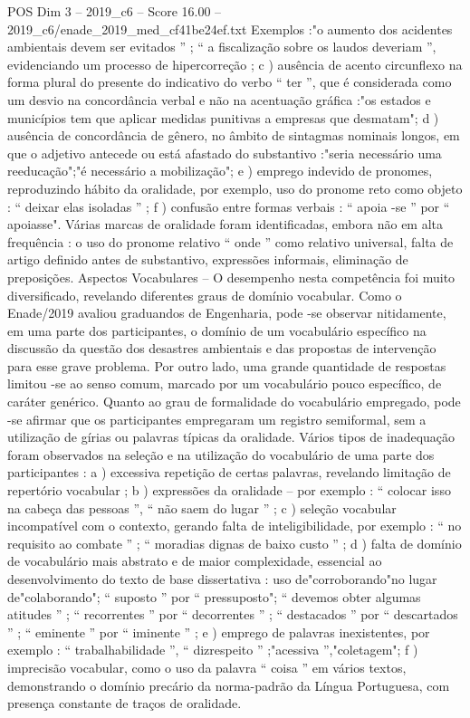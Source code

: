 \begin{textsample}{POS Dim 3 – 2019\_c6 – Score 16.00 – 2019\_c6/enade\_2019\_med\_cf41be24ef.txt}
Exemplos :"o aumento dos acidentes ambientais devem ser evitados ” ; “ a fiscalização sobre os laudos deveriam ”, evidenciando um processo de hipercorreção ; c ) ausência de acento circunflexo na forma plural do presente do indicativo do verbo “ ter ”, que é considerada como um desvio na concordância verbal e não na acentuação gráfica :"os estados e municípios tem que aplicar medidas punitivas a empresas que desmatam"; d ) ausência de concordância de gênero, no âmbito de sintagmas nominais longos, em que o adjetivo antecede ou está afastado do substantivo :"seria necessário uma reeducação";"é necessário a mobilização"; e ) emprego indevido de pronomes, reproduzindo hábito da oralidade, por exemplo, uso do pronome reto como objeto : “ deixar elas isoladas ” ; f ) confusão entre formas verbais : “ apoia -se ” por “ apoiasse".
Várias marcas de oralidade foram identificadas, embora não em alta frequência : o uso do pronome relativo “ onde ” como relativo universal, falta de artigo definido antes de substantivo, expressões informais, eliminação de preposições.
Aspectos Vocabulares – O desempenho nesta competência foi muito diversificado, revelando diferentes graus de domínio vocabular.
Como o Enade/2019 avaliou graduandos de Engenharia, pode -se observar nitidamente, em uma parte dos participantes, o domínio de um vocabulário específico na discussão da questão dos desastres ambientais e das propostas de intervenção para esse grave problema.
Por outro lado, uma grande quantidade de respostas limitou -se ao senso comum, marcado por um vocabulário pouco específico, de caráter genérico.
Quanto ao grau de formalidade do vocabulário empregado, pode -se afirmar que os participantes empregaram um registro semiformal, sem a utilização de gírias ou palavras típicas da oralidade.
Vários tipos de inadequação foram observados na seleção e na utilização do vocabulário de uma parte dos participantes : a ) excessiva repetição de certas palavras, revelando limitação de repertório vocabular ; b ) expressões da oralidade – por exemplo : “ colocar isso na cabeça das pessoas ”, “ não saem do lugar ” ; c ) seleção vocabular incompatível com o contexto, gerando falta de inteligibilidade, por exemplo : “ no requisito ao combate ” ; “ moradias dignas de baixo custo ” ; d ) falta de domínio de vocabulário mais abstrato e de maior complexidade, essencial ao desenvolvimento do texto de base dissertativa : uso de"corroborando"no lugar de"colaborando"; “ suposto ” por “ pressuposto"; “ devemos obter algumas atitudes ” ; “ recorrentes ” por “ decorrentes ” ; “ destacados ” por “ descartados ” ; “ eminente ” por “ iminente ” ; e ) emprego de palavras inexistentes, por exemplo : “ trabalhabilidade ”, “ dizrespeito ” ;"acessiva ”,"coletagem"; f ) imprecisão vocabular, como o uso da palavra “ coisa ” em vários textos, demonstrando o domínio precário da norma-padrão da Língua Portuguesa, com presença constante de traços de oralidade.

\end{textsample}
